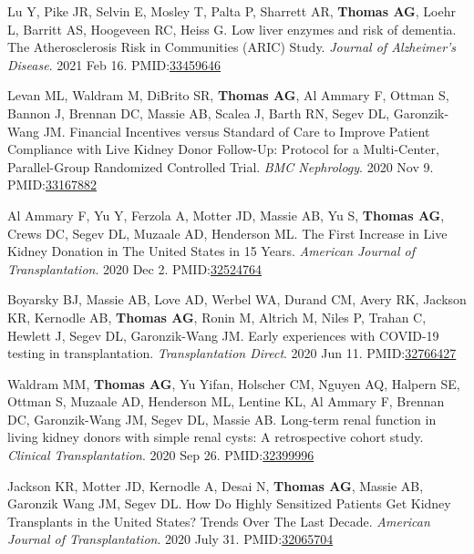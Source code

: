 \documentclass[10pt]{article}
\makeatletter
\newlength{\bibhang}
\newlength{\bibsep}
 {\@listi \global\bibsep\itemsep \global\advance\bibsep by\parsep}
\newenvironment{bibenum*}
  {\renewcommand\labelenumi{[\theenumi]}%
   \etaremune[
     topsep=0pt,
     itemsep=\bibsep,
     parsep=0pt,partopsep=0pt,
     itemindent=-\bibhang,
     leftmargin={\bibhang+\widthof{[999]}}]}
  {\endetaremune}
\newcommand{\pmid}[1]{PMID:\href{https://www.ncbi.nlm.nih.gov/pubmed/#1}{#1}}
\makeatother
\begin{document}
\begin{bibenum*}
\item Lu Y, Pike JR, Selvin E, Mosley T, Palta P, Sharrett AR, 
  \textbf{Thomas AG},
  Loehr L, Barritt AS, Hoogeveen RC, Heiss G. 
  Low liver enzymes and risk of dementia. 
  The Atherosclerosis Risk in Communities (ARIC) Study.
  \emph{Journal of Alzheimer's Disease}. 2021 Feb 16.
  \pmid{33459646} 

\item Levan ML, Waldram M,  DiBrito SR, \textbf{Thomas AG}, Al Ammary F,
  Ottman S, Bannon J, Brennan DC, Massie AB, Scalea J, Barth RN, Segev DL,
  Garonzik-Wang JM.
  Financial Incentives versus Standard of Care to Improve Patient Compliance
  with Live Kidney Donor Follow-Up: Protocol for a Multi-Center,
  Parallel-Group Randomized Controlled Trial.
  \emph{BMC Nephrology}. 2020 Nov 9.
  \pmid{33167882} 

\item Al Ammary F, Yu Y, Ferzola A, Motter JD, Massie AB, Yu S,
  \textbf{Thomas AG}, Crews DC, Segev DL, Muzaale AD, Henderson ML.
  The First Increase in Live Kidney Donation in The United States
  in 15 Years.
  \emph{American Journal of Transplantation}. 2020 Dec 2.
  \pmid{32524764} 

\item Boyarsky BJ, Massie AB, Love AD, Werbel WA, Durand CM, Avery RK,
  Jackson KR, Kernodle AB, \textbf{Thomas AG}, Ronin M,
  Altrich M, Niles P, Trahan C, Hewlett J, Segev DL, Garonzik-Wang JM.
  Early experiences with COVID-19 testing in transplantation.
  \emph{Transplantation Direct}. 2020 Jun 11.
  \pmid{32766427} 

\item Waldram MM\dag, \textbf{Thomas AG\dag}, Yu Yifan, Holscher CM,
  Nguyen AQ, Halpern SE, Ottman S, Muzaale AD, Henderson ML, Lentine KL,
  Al Ammary F, Brennan DC, Garonzik-Wang JM, Segev DL, Massie AB.
  Long-term renal function in living kidney donors with simple renal cysts:
  A retrospective cohort study.
  \emph{Clinical Transplantation}. 2020 Sep 26.
  \pmid{32399996} 

\item Jackson KR\dag, Motter JD\dag, Kernodle A, Desai N, \textbf{Thomas AG},
 Massie AB, Garonzik Wang JM, Segev DL.
 How Do Highly Sensitized Patients Get Kidney Transplants in the
 United States? Trends Over The Last Decade.
 \emph{American Journal of Transplantation}. 2020 July 31.
 \pmid{32065704} 


\end{bibenum*}
\end{document}
